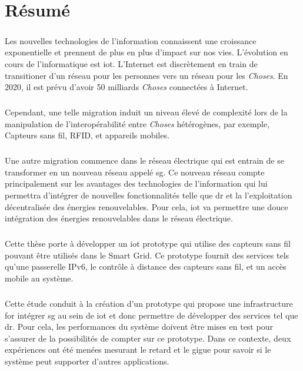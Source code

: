 \documentclass[oneside,12pt,a4paper,final]{book}
\begin{document}
\chapter*{Résumé}
\paragraph{}
Les nouvelles technologies de l'information connaissent une croissance exponentielle et prennent de plus en plus d'impact sur nos vies. L'évolution en cours de l'informatique est \gls{iot}. L'Internet est discrètement en train de transitioner d'un réseau pour les personnes vers un réseau pour les \textit{Choses}. En 2020, il est prévu d'avoir 50 milliards \textit{Choses} connectées à Internet.
\paragraph{}
Cependant, une telle migration induit un niveau élevé de complexité lors de la manipulation de l'interopérabilité entre \textit{Choses} hétérogènes, par exemple, Capteurs sans fil, RFID, et appareils mobiles.
\paragraph{}
Une autre migration commence dans le réseau électrique qui est entrain de se transformer en un nouveau réseau appelé \gls{sg}. Ce nouveau réseau compte principalement sur les avantages des technologies de l'information qui lui permettra d'intégrer de nouvelles fonctionnalités telle que \gls{dr} et la l'exploitation décentralisée des énergies renouvelables. Pour cela, \gls{iot} va permettre une douce intégration des énergies renouvelables dans le réseau électrique.
\paragraph{} 
Cette thèse porte à développer un \gls{iot} prototype qui utilise des capteurs sans fil pouvant être utilisés dans le Smart Grid. Ce prototype fournit des services tels qu'une passerelle IPv6, le contrôle à distance des capteurs sans fil, et un accès mobile au système.
\paragraph{}
Cette étude conduit à la création d'un prototype qui propose une infrastructure for intégrer \gls{sg} au sein de \gls{iot} et donc permettre de développer des services tel que \gls{dr}. Pour cela, les performances du système doivent être mises en test pour s'assurer de la possibilités de compter sur ce prototype. Dans ce contexte, deux expériences ont été menées mesurant le retard et le gigue pour savoir si le système peut supporter d'autres applications.
\end{document}
